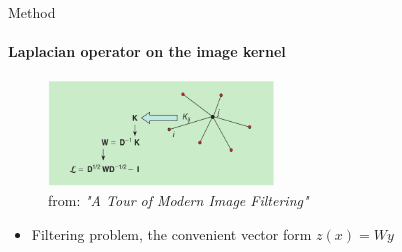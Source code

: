 \documentclass[beamer]{standalone}
\begin{document}
\begin{frame}{Method}
    \framesubtitle{Laplacian operator on the image kernel}
        \begin{figure}[t]
        \centering
            \includegraphics[width=6cm]{./figures/image-kernel-laplacian.png}
            \caption{from: \emph{"A Tour of Modern Image Filtering"}}
        \end{figure}
        \begin{itemize}
            \item Filtering problem, the convenient vector form $z(x)=Wy$
        \end{itemize}
        \begin{table}
            \centering
        \end{table}

    \note[item] {
    }
\end{frame}
\end{document}
